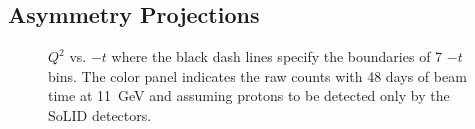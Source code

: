 \subsection{Asymmetry Projections}

\begin{figure}[!ht]
 \begin{center}
   \caption[$Q^{2}$ vs. $-t$]{\footnotesize{$Q^{2}$ vs. $-t$ where the black
       dash lines specify the boundaries of 7 $-t$ bins. The color panel
       indicates the raw counts with 48 days of beam time at 11~GeV and
       assuming protons to be detected only by the SoLID detectors.}}
  \label{Q2_t_bin}
  \end{center}
\end{figure}

